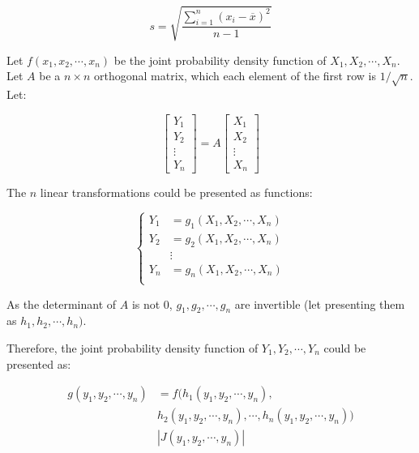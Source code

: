 \documentclass{article}
\begin{document}
\begin{equation}
    s=\sqrt{\frac{\sum_{i=1}^n(x_i-\overline{x})^2}{n-1}}
\end{equation}

Let \(f(x_1, x_2, \cdots, x_n)\) be the joint probability density function 
of \(X_1, X_2, \cdots, X_n\). Let \(A\) be a \(n\times n\) orthogonal matrix, which each
element of the first row is \(1/\sqrt{n}\).
Let:

\begin{equation}
    \begin{bmatrix}
        Y_1\\
        Y_2\\
        \vdots\\
        Y_n
    \end{bmatrix} = A
    \begin{bmatrix}
        X_1\\
        X_2\\
        \vdots\\
        X_n
    \end{bmatrix}
\end{equation}

The \(n\) linear transformations could be presented as functions:

\begin{equation}
    \left\{
        \begin{split}
            Y_1 &= g_1(X_1, X_2, \cdots, X_n)\\
            Y_2 &= g_2(X_1, X_2, \cdots, X_n)\\
            &\vdots \\
            Y_n &= g_n(X_1, X_2, \cdots, X_n)\\
        \end{split}
    \right.
\end{equation}

As the determinant of \(A\) is not \(0\), \(g_1, g_2, \cdots, g_n\)
are invertible (let presenting them as \(h_1, h_2, \cdots, h_n)\).

Therefore, the joint probability density function of \(Y_1, Y_2, \cdots,
Y_n\) could be presented as:

\begin{equation}
    \begin{split}
    g(y_1,y_2,\cdots,y_n)&=f(h_1(y_1,y_2,\cdots,y_n),\\
    &h_2(y_1,y_2,\cdots,y_n),\cdots,h_n(y_1,y_2,\cdots,y_n))\\
    &|J(y_1,y_2,\cdots,y_n)|
    \end{split}
\end{equation}
\end{document}
